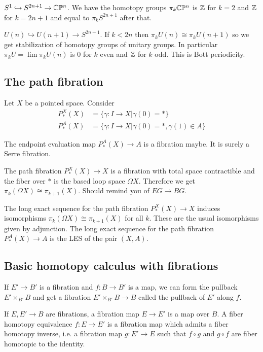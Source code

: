 \documentclass[12pt]{article}
\begin{document}
    \begin{example}
        $S^1 \hookrightarrow S^{2n+1} \to \mathbb{C}\mathbb{P}^n$. We have the homotopy groups $\pi_k \mathbb{C}\mathbb{P}^n$ is $\mathbb{Z}$ for $k=2$ and $\mathbb{Z}$ for $k=2n+1$ and equal to $\pi_k S^{2n+1}$ after that.
    \end{example}

    \begin{example}
        $U(n) \hookrightarrow U(n+1) \to S^{2n+1}$. If $k < 2n$ then $\pi_k U(n) \cong \pi_k U(n+1)$ so we get stabilization of homotopy groups of unitary groups. In particular $\pi_k U = \lim \pi_k U(n)$ is $0$ for $k$ even and $\mathbb{Z}$ for $k$ odd. This is Bott periodicity.
    \end{example}

    \subsection{The path fibration}
    Let $X$ be a pointed space. Consider \begin{align*}
        P^X_*(X) &= \{\gamma: I \to X | \gamma(0) = *\}\\
        P^A_*(X) &= \{\gamma: I \to X | \gamma(0) = *, \gamma(1) \in A\}
    \end{align*}

    \begin{proposition}
        The endpoint evaluation map $P^A_*(X) \to A$ is a fibration maybe. It is surely a Serre fibration.
    \end{proposition}
    The path fibration $P_*^X(X) \to X$ is a fibration with total space contractible and the fiber over $*$ is the based loop space $\Omega X$. Therefore we get $\pi_k(\Omega X) \cong \pi_{k+1}(X)$. Should remind you of $EG \to BG$.

    \begin{proposition}
        The long exact sequence for the path fibration $P^X_*(X) \to X$ induces isomorphisms $\pi_k(\Omega X) \cong \pi_{k+1}(X)$ for all $k$. These are the usual isomorphisms given by adjunction.
        The long exact sequence for the path fibration $P^A_*(X) \to A$ is the LES of the pair $(X,A)$.
    \end{proposition}

    \subsection{Basic homotopy calculus with fibrations}

    \begin{definition}
        If $E' \to B'$ is a fibration and $f: B \to B'$ is a map, we can form the pullback $E' \times_{B'} B$ and get a fibration $E' \times_{B'} B \to B$ called the pullback of $E'$ along $f$.
    \end{definition} 
    If $E,E'\to B$ are fibrations, a fibration map $E \to E'$ is a map over $B$. A fiber homotopy equivalence $f: E \to E'$ is a fibration map which admits a fiber homotopy inverse, i.e. a fibration map $g: E' \to E$ such that $f\circ g$ and $g\circ f$ are fiber homotopic to the identity.
\end{document}
